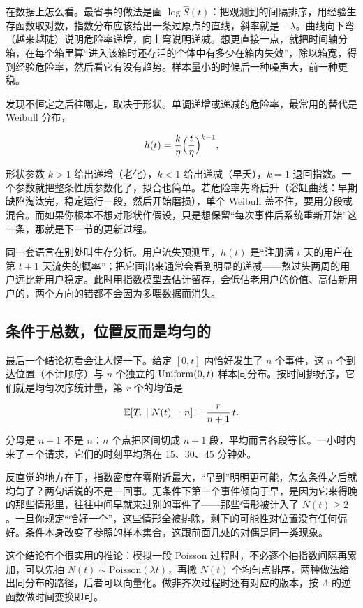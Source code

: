 在数据上怎么看。最省事的做法是画 \(\log\hat S(t)\)：把观测到的间隔排序，用经验生存函数取对数，指数分布应该给出一条过原点的直线，斜率就是 \(-\lambda\)。曲线向下弯（越来越陡）说明危险率递增，向上弯说明递减。想更直接一点，就把时间轴分箱，在每个箱里算``进入该箱时还存活的个体中有多少在箱内失效''，除以箱宽，得到经验危险率，然后看它有没有趋势。样本量小的时候后一种噪声大，前一种更稳。

发现不恒定之后往哪走，取决于形状。单调递增或递减的危险率，最常用的替代是 Weibull 分布，

\[
h(t)=\frac{k}{\eta}\Bigl(\frac{t}{\eta}\Bigr)^{k-1},
\]

形状参数 \(k>1\) 给出递增（老化），\(k<1\) 给出递减（早夭），\(k=1\) 退回指数。一个参数就把整条性质参数化了，拟合也简单。若危险率先降后升（浴缸曲线：早期缺陷淘汰完，稳定运行一段，然后开始磨损），单个 Weibull 盖不住，要用分段或混合。而如果你根本不想对形状作假设，只是想保留``每次事件后系统重新开始''这一条，那就是下一节的更新过程。

同一套语言在别处叫生存分析。用户流失预测里，\(h(t)\) 是``注册满 \(t\) 天的用户在第 \(t+1\) 天流失的概率''；把它画出来通常会看到明显的递减——熬过头两周的用户远比新用户稳定。此时用指数模型去估计留存，会低估老用户的价值、高估新用户的，两个方向的错都不会因为多喂数据而消失。

\subsection{条件于总数，位置反而是均匀的}

最后一个结论初看会让人愣一下。给定 \([0,t]\) 内恰好发生了 \(n\) 个事件，这 \(n\) 个到达位置（不计顺序）与 \(n\) 个独立的 \(\operatorname{Uniform}(0,t)\) 样本同分布。按时间排好序，它们就是均匀次序统计量，第 \(r\) 个的均值是

\[
\mathbb{E}[T_r\mid N(t)=n]=\frac{r}{n+1}\,t.
\]

分母是 \(n+1\) 不是 \(n\)：\(n\) 个点把区间切成 \(n+1\) 段，平均而言各段等长。一小时内来了三个请求，它们的时刻平均落在 15、30、45 分钟处。

反直觉的地方在于，指数密度在零附近最大，``早到''明明更可能，怎么条件之后就均匀了？两句话说的不是一回事。无条件下第一个事件倾向于早，是因为它来得晚的那些情形里，往往中间早就来过别的事件了——那些情形被计入了 \(N(t)\ge2\)。一旦你规定``恰好一个''，这些情形全被排除，剩下的可能性对位置没有任何偏好。条件本身改变了参照的样本集合，这跟前面几处的对偶是同一类现象。

这个结论有个很实用的推论：模拟一段 Poisson 过程时，不必逐个抽指数间隔再累加，可以先抽 \(N(t)\sim\mathrm{Poisson}(\lambda t)\)，再撒 \(N(t)\) 个均匀点排序，两种做法给出同分布的路径，后者可以向量化。做非齐次过程时还有对应的版本，按 \(\Lambda\) 的逆函数做时间变换即可。

